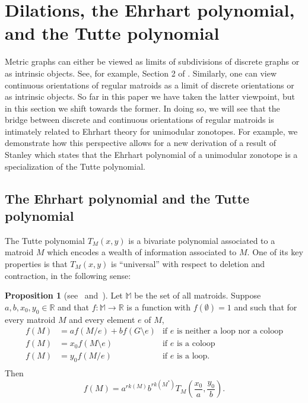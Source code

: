 \documentclass[12pt]{amsart}
\newcommand{\RR}{\mathbb{R}}
\numberwithin{equation}{section}
\theoremstyle{definition}
\newtheorem{proposition}[theorem]{Proposition}
\begin{document}
\section{Dilations, the Ehrhart polynomial, and the Tutte polynomial}

Metric graphs can either be viewed as limits of subdivisions of discrete graphs or as intrinsic objects. See, for example, Section 2 of  \cite{baker2006metrized}.
Similarly, one can view continuous orientations of regular matroids as a limit of discrete orientations or as intrinsic objects.  So far in this paper we have taken the latter viewpoint, but in this section we shift towards the former.  In doing so, we will see that the bridge between discrete and continuous orientations of regular matroids is intimately related to Ehrhart theory for unimodular zonotopes.  For example, we demonstrate how this perspective allows for a new derivation of a result of Stanley which states that the Ehrhart polynomial of a unimodular zonotope is a specialization of the Tutte polynomial.



\subsection{The Ehrhart polynomial and the Tutte polynomial}

The Tutte polynomial $T_M(x,y)$ is a bivariate polynomial associated to a matroid $M$ which encodes a wealth of information associated to $M$.  One of its key properties is that  $T_M(x,y)$ is ``universal'' with respect to deletion and contraction, in the following sense:

\begin{proposition}[see~{\cite[Theorem 1]{welsh2000potts}} and~{\cite[Theorem 2.16]{welsh1999tutte}}] \label{thm:gentutte}
Let $\mathbb{M}$ be the set of all matroids. Suppose $a,b,x_0,y_0 \in \RR$ and that $f\colon \mathbb{M} \to \RR$ is a function with $f(\emptyset)=1$ and such that for every matroid $M$ and every element $e$ of $M$,
\begin{align*}
f(M) &= af(M / e) + bf(G\setminus e) &\textrm{if $e$ is neither a loop nor a coloop}\\
f(M) &= x_0f(M \setminus e)  &\textrm{if $e$ is a coloop} \\
f(M) &= y_0f(M / e)  &\textrm{if $e$ is a loop.}\\
\end{align*}
Then  
\[f(M) = a^{rk(M)}b^{rk(M^*)}T_{M}(\frac{x_0}{a},\frac{y_0}{b}).\]
\end{proposition}
\end{document}
